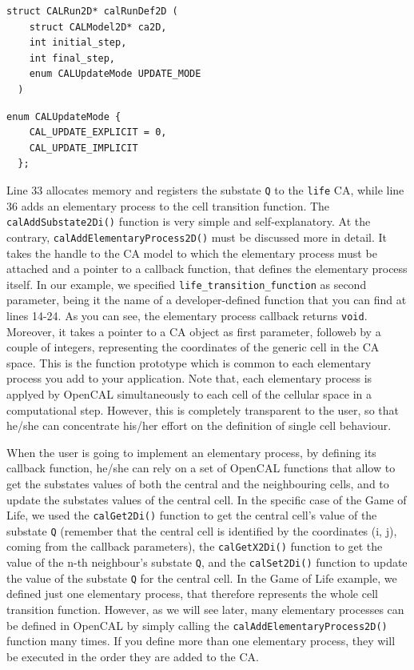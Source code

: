 \begin{lstlisting}[float,floatplacement=H, label=lst:calRunDef2D(), caption=Definition of the calRunDef2D() function., numbers=none]
  struct CALRun2D* calRunDef2D (
    struct CALModel2D* ca2D,
    int initial_step,
    int final_step,
    enum CALUpdateMode UPDATE_MODE 
  )	
\end{lstlisting}

\begin{lstlisting}[float,floatplacement=H, label=lst:CALUpdateMode, caption=The CALUpdateMode enum type., numbers=none]
  enum CALUpdateMode {
    CAL_UPDATE_EXPLICIT = 0,
    CAL_UPDATE_IMPLICIT
  };
\end{lstlisting}

Line 33 allocates memory and registers the substate \verb'Q' to the
\verb'life' CA, while line 36 adds an elementary process to the cell
transition function. The \verb'calAddSubstate2Di()' function is very
simple and self-explanatory. At the contrary,
\verb'calAddElementaryProcess2D()' must be discussed more in detail. It
takes the handle to the CA model to which the elementary process must
be attached and a pointer to a callback function, that defines the
elementary process itself. In our example, we specified
\verb'life_transition_function' as second parameter, being it the name
of a developer-defined function that you can find at lines 14-24. As
you can see, the elementary process callback returns
\verb'void'. Moreover, it takes a pointer to a CA object as first
parameter, followeb by a couple of integers, representing the
coordinates of the generic cell in the CA space. This is the function
prototype which is common to each elementary process you add to your
application. Note that, each elementary process is applyed by OpenCAL
simultaneously to each cell of the cellular space in a computational
step. However, this is completely transparent to the user, so that he/she
can concentrate his/her effort on the definition of single cell behaviour.

When the user is going to implement an elementary process, by defining
its callback function, he/she can rely on a set of OpenCAL functions that
allow to get the substates values of both the central and the
neighbouring cells, and to update the substates values of the central
cell. In the specific case of the Game of Life, we used the
\verb'calGet2Di()' function to get the central cell's value of the
substate \verb'Q' (remember that the central cell is identified by the
coordinates (i, j), coming from the callback parameters), the
\verb'calGetX2Di()' function to get the value of the n-th neighbour's
substate \verb'Q', and the \verb'calSet2Di()' function to update the
value of the substate \verb'Q' for the central cell. In the Game of
Life example, we defined just one elementary process, that therefore
represents the whole cell transition function. However, as we will see
later, many elementary processes can be defined in OpenCAL by simply
calling the \verb'calAddElementaryProcess2D()' function many times. If
you define more than one elementary process, they will be executed in
the order they are added to the CA.


